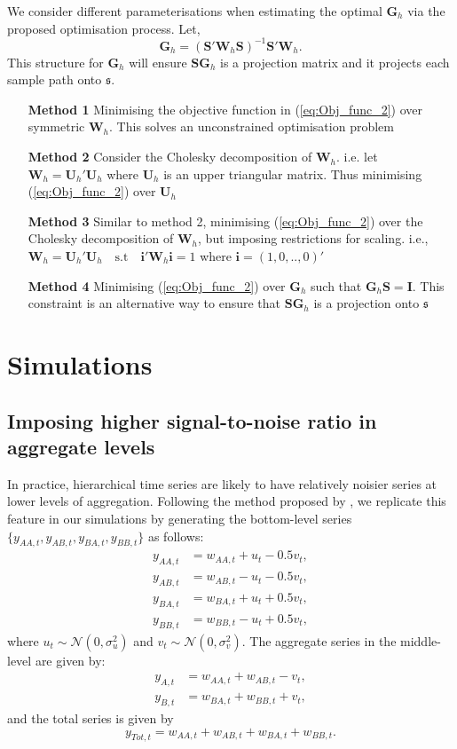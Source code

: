 \documentclass[12pt]{article}
\theoremstyle{definition}
\begin{document}
We consider different parameterisations when estimating the optimal $\bm{G}_h$ via the proposed optimisation process. Let,
\begin{equation}\label{eq:StructureofG}
\bm{G}_h = (\bm{S'W}_h\bm{S})^{-1}\bm{S'W}_h.
\end{equation}
This structure for $\bm{G}_h$ will ensure $\bm{SG}_h$ is a projection matrix and it projects each sample path onto $\mathfrak{s}$.
\begin{itemize}
	\item[\textbf{Method 1}] Minimising the objective function in (\ref{eq:Obj_func_2}) over symmetric $\bm{W}_h$. This solves an unconstrained optimisation problem
	\item[\textbf{Method 2}] Consider the Cholesky decomposition of $\bm{W}_h$. i.e. let $\bm{W}_h = \bm{U}_h'\bm{U}_h$ where $\bm{U}_h$ is an upper triangular matrix. Thus minimising (\ref{eq:Obj_func_2}) over $\bm{U}_h$
	\item[\textbf{Method 3}] Similar to method 2, minimising (\ref{eq:Obj_func_2}) over the Cholesky decomposition of $\bm{W}_h$, but imposing restrictions for scaling. i.e., $\bm{W}_h=\bm{U}_h'\bm{U}_h \quad \text{s.t} \quad \bm{i'}\bm{W}_h\bm{i}=1$ where $\bm{i}=(1,0,..,0)'$
	\item[\textbf{Method 4}] Minimising (\ref{eq:Obj_func_2}) over $\bm{G}_h$ such that $\bm{G}_h\bm{S}=\bm{I}$. This constraint is an alternative way to ensure that $\bm{SG}_h$ is a projection onto $\mathfrak{s}$
	
\end{itemize}

\section{Simulations}

\subsection{Imposing higher signal-to-noise ratio in aggregate levels}\label{Append:sig-to-noise}

In practice, hierarchical time series are likely to have relatively noisier series at lower levels of aggregation. Following the method proposed by \citet{WicEtAl2019}, we replicate this feature in our simulations by generating the bottom-level series $\{y_{AA,t},y_{AB,t},y_{BA,t},y_{BB,t}\}$ as follows:
\begin{align*}
y_{AA,t} &= w_{AA,t} + u_t - 0.5v_t,\\
y_{AB,t} &= w_{AB,t} - u_t - 0.5v_t,\\
y_{BA,t} &= w_{BA,t} + u_t + 0.5v_t,\\
y_{BB,t} &= w_{BB,t} - u_t + 0.5v_t,
\end{align*}
where $u_t \sim \mathcal{N}(0,\sigma^2_u)$ and $v_t \sim \mathcal{N}(0,\sigma^2_v)$. The aggregate series in the middle-level are given by:
\begin{align*}
y_{A,t} &= w_{AA,t} + w_{AB,t} - v_t,\\
y_{B,t} &= w_{BA,t} + w_{BB,t} + v_t,
\end{align*}
and the total series is given by
\[
y_{Tot,t} = w_{AA,t} + w_{AB,t} + w_{BA,t} + w_{BB,t}.
\]
\end{document}

